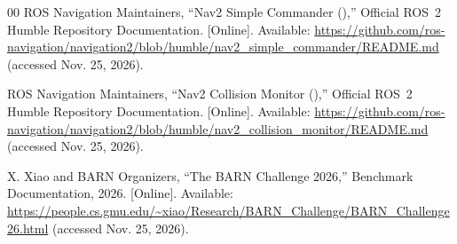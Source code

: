 \documentclass[conference,a4paper]{IEEEtran}
\begin{document}
\begin{thebibliography}{00}
 ROS Navigation Maintainers, ``Nav2 Simple Commander (),'' Official ROS~2 Humble Repository Documentation. [Online]. Available: \url{https://github.com/ros-navigation/navigation2/blob/humble/nav2_simple_commander/README.md} (accessed Nov. 25, 2026).

 ROS Navigation Maintainers, ``Nav2 Collision Monitor (),'' Official ROS~2 Humble Repository Documentation. [Online]. Available: \url{https://github.com/ros-navigation/navigation2/blob/humble/nav2_collision_monitor/README.md} (accessed Nov. 25, 2026).

 X. Xiao and BARN Organizers, ``The BARN Challenge 2026,'' Benchmark Documentation, 2026. [Online]. Available: \url{https://people.cs.gmu.edu/~xiao/Research/BARN_Challenge/BARN_Challenge26.html} (accessed Nov. 25, 2026).

\end{thebibliography}
\end{document}

